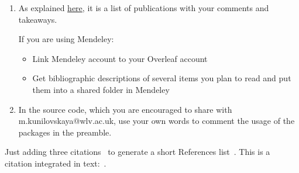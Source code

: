 \documentclass[a4paper,11pt]{article}
\begin{document}
\begin{tcolorbox}[width=\textwidth, colback={yellow!40!white}, title={Create an annotated bibliography and revise imported packages}, colbacktitle=yellow!60!white, coltitle=black]
	\begin{enumerate}
		\item As explained \href{https://www.wlv.ac.uk/lib/media/departments/lis/skills/study-guides/LS136-Guide-to-Writing-an-Annotated-Bibliography.pdf}{here}, it is a list of publications with your comments and takeaways.
		
			If you are using Mendeley:
			\begin{itemize}
				\item Link Mendeley account to your Overleaf account
				\item Get bibliographic descriptions of several items you plan to read and put them into a shared folder in Mendeley
			\end{itemize}
		\item In the source code, which you are encouraged to share with m.kunilovskaya@wlv.ac.uk, use your own words to comment the usage of the packages in the preamble.
	\end{enumerate}
	
\end{tcolorbox}%

\bigskip


Just adding three citations~\citep{Scarton2018} to generate a short References list~\citet[p.~215]{Battisti2020}. This is a citation integrated in text:~\citet{Tantau2022}.


\bigskip










\end{document}
